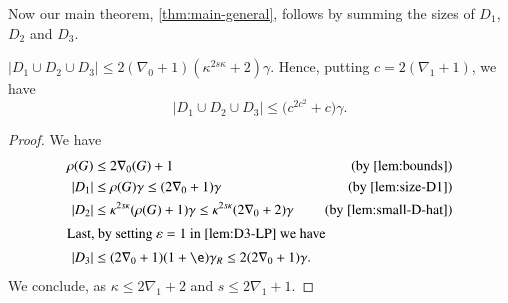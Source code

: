 Now our main theorem, \cref{thm:main-general}, follows by summing the sizes of
$D_1$, $D_2$ and $D_3$.

\begin{lemma}
$|D_1\cup D_2\cup D_3|\le 2(\nabla_0+1)(\kappa^{2s\kappa}+2)\gamma$.
Hence, putting  $c=2(\nabla_1+1)$, we have
\[
|D_1\cup D_2\cup D_3|\le \bigl(c^{2c^2}+c\bigr)\gamma.
\]
\end{lemma}
\begin{proof}
We have
\begin{align*}
	\rho(G)&\leq 2\nabla_0(G)+1&\text{(by \cref{lem:bounds})}\\
	|D_1|&\leq \rho(G)\gamma\leq (2\nabla_0+1)\gamma&\text{(by \cref{lem:size-D1})}\\
	|D_2| &\le \kappa^{2s\kappa}(\rho(G)+1)\gamma\leq \kappa^{2s\kappa}(2\nabla_0+2)\gamma&\text{(by \cref{lem:small-D-hat})}\\
	\intertext{Last, by setting $\epsilon=1$ in \cref{lem:D3-LP} we have}
	|D_3|&\leq (2\nabla_0+1)(1+\e)\gamma_R\leq 2(2\nabla_0+1)\gamma.
\end{align*}
We conclude, as  $\kappa\le 2\nabla_1+2$ and $s\leq 2\nabla_1+1$.

\end{proof}
